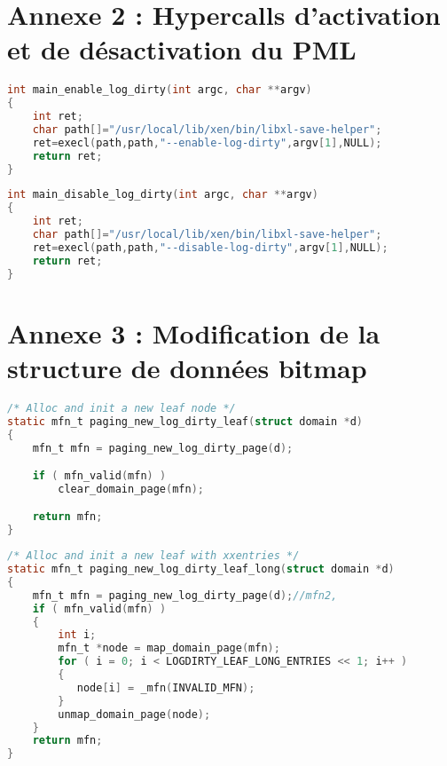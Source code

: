 \section{Annexe 2 : Hypercalls d'activation et de désactivation du PML}
\label{section:enable_disable_logdirty}

\begin{lstlisting}[language=C, caption=xl enable-log-dirty, label={lst:enable_logdirty}]
int main_enable_log_dirty(int argc, char **argv)
{
    int ret;
    char path[]="/usr/local/lib/xen/bin/libxl-save-helper";
    ret=execl(path,path,"--enable-log-dirty",argv[1],NULL); 
    return ret;
}
\end{lstlisting}

\begin{lstlisting}[language=C, caption=xl disable-log-dirty, label={lst:disable_logdirty}]
int main_disable_log_dirty(int argc, char **argv)
{
    int ret;
    char path[]="/usr/local/lib/xen/bin/libxl-save-helper";
    ret=execl(path,path,"--disable-log-dirty",argv[1],NULL);
    return ret;
}
\end{lstlisting}

\section{Annexe 3 : Modification de la structure de données bitmap}
\label{section:bitmap}

\begin{lstlisting}[language=C, caption=Méthode appelée générer une feuille L1 avant modification de la bitmap, label={lst:leaf_bit}]
/* Alloc and init a new leaf node */
static mfn_t paging_new_log_dirty_leaf(struct domain *d)
{
    mfn_t mfn = paging_new_log_dirty_page(d);

    if ( mfn_valid(mfn) )
        clear_domain_page(mfn);

    return mfn;
}
\end{lstlisting}

\begin{lstlisting}[language=C, caption=Méthode appelée pour générer un noeud L1 après modification de la bitmap, label={lst:leaf_UL}]
/* Alloc and init a new leaf with xxentries */
static mfn_t paging_new_log_dirty_leaf_long(struct domain *d)
{    
    mfn_t mfn = paging_new_log_dirty_page(d);//mfn2, 
    if ( mfn_valid(mfn) )
    {
        int i;
        mfn_t *node = map_domain_page(mfn);
        for ( i = 0; i < LOGDIRTY_LEAF_LONG_ENTRIES << 1; i++ )
        {
           node[i] = _mfn(INVALID_MFN);       
        }       
        unmap_domain_page(node);
    }  
    return mfn;
}
\end{lstlisting}

